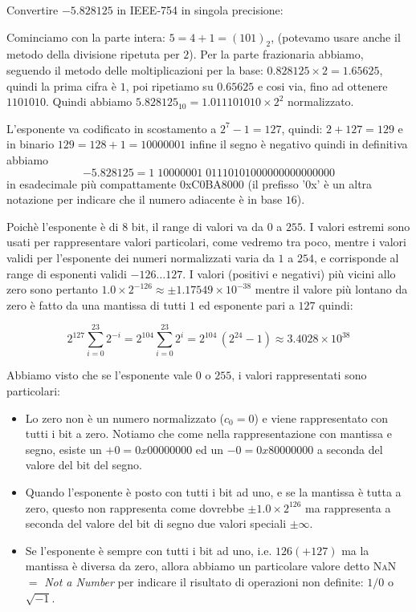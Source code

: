\begin{ex}
	Convertire $-5.828125$ in IEEE-754 in singola precisione:
	
	Cominciamo con la parte intera: $5 = 4+1 = (101)_2$, (potevamo usare anche il metodo della divisione ripetuta per $2$). Per la parte frazionaria abbiamo, seguendo il metodo delle moltiplicazioni per la base: $0.828125 \times 2 = 1.65625$, quindi la prima cifra è $1$, poi ripetiamo su $0.65625$ e cosi via, fino ad ottenere $1101010$. Quindi abbiamo $5.828125_{10} = 1.011101010\times 2^2$ normalizzato. 
	
	L'esponente va codificato in scostamento a $2^7-1=127$, quindi: $2+127 = 129$ e in binario $129 = 128+1 = 10000001$ infine il segno è negativo quindi in definitiva abbiamo
	\[ -5.828125 = 1\;10000001\;01110101000000000000000 \]
in esadecimale più compattamente 0xC0BA8000 (il prefisso '0x' è un altra notazione per indicare che il numero adiacente è in base $16$).
\end{ex}
Poichè l'esponente è di $8$ bit, il range di valori va da $0$ a $255$. I valori estremi sono usati per rappresentare valori particolari, come vedremo tra poco, mentre i valori validi per l'esponente dei numeri normalizzati varia da $1$ a $254$, e corrisponde al range di esponenti validi $-126 \ldots 127$.
I valori (positivi e negativi) più vicini allo zero sono pertanto $1.0 \times 2^{-126} \approx \pm 1.17549 \times 10^{-38}$ mentre il valore più lontano da zero è fatto da una mantissa di tutti $1$ ed esponente pari a $127$ quindi: 

\[ 2^{127} \sum_{i=0}^{23} 2^{-i} =  2^{104} \sum_{i=0}^{23} 2^i = 2^{104}\, (2^{24}-1) \approx 3.4028 \times 10^{38} \]

Abbiamo visto che se l'esponente vale $0$ o $255$, i valori rappresentati sono particolari:
\begin{itemize}
	\item Lo zero non è un numero normalizzato ($c_0 = 0$) e viene rappresentato con tutti i bit a zero. Notiamo che come nella rappresentazione
	con mantissa e segno, esiste un $+0 = 0x00000000$ ed un $-0 = 0x80000000$ a seconda del valore del bit del segno.
	\item Quando l'esponente è posto con tutti i bit ad uno, e se la mantissa è tutta a zero, questo non rappresenta come dovrebbe $\pm 1.0 \times 2^{126}$ ma
	rappresenta a seconda del valore del bit di segno due valori speciali $\pm \infty$. 
	\item Se l'esponente è sempre con tutti i bit ad uno, i.e. $126 (+127)$ ma la mantissa è diversa da zero, allora abbiamo un particolare valore detto \textsc{NaN} $=$ \emph{Not a Number} per indicare il risultato di operazioni non definite: $1/0$ o $\sqrt{-1}$.
\end{itemize}

